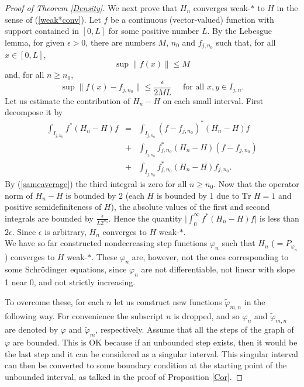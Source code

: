 \documentclass[preprint,12pt]{elsarticle}
\begin{document}
\begin{proof}[Proof of Theorem \ref{Density}]
We next prove that $H_n$  converges weak-$\ast$ to $H$ in the sense of (\ref{weak*conv}). Let $f$ be a continuous (vector-valued) function with support contained in $[0,L]$ for some positive number $L$. By the Lebesgue lemma, for given $\epsilon>0$, there are numbers $M$, $n_0$ and $f_{j,n_0}$ such that, for all $x\in[0,L]$,
\begin{equation*}
  \sup \| f(x) \| \leq M 
\end{equation*}
 and, for all $n\ge n_0$,
\begin{equation*}
  \sup \| f(x)-f_{j,n_0} \| \leq \frac{\epsilon}{2ML} \quad \textrm{ for all } x,y\in I_{j,n}.  
\end{equation*}
Let us estimate the contribution of $H_n-H$  on each small interval. First decompose it by 
\begin{eqnarray*}
\int_{I_{j,n_0}}f^*(H_n-H) f &=& \int_{I_{j,n_0}}(f-f_{j,n_0})^* (H_n-H) f \\
 &+ & \int_{I_{j,n_0}}f_{j,n_0}^* (H_n-H) (f-f_{j,n_0})  \\
 &+&  \int_{I_{j,n_0}}f_{j,n_0}^*(H_n-H) f_{j,n_0}. 
\end{eqnarray*}
By (\ref{sameaverage}) the third integral is zero for all $n\ge n_0$. Now that the operator norm of $H_n-H$ is bounded by 2 (each $H$ is bounded by 1 due to $\textrm{Tr }H=1$ and positive semidefiniteness of $H$), the absolute values of the first and second integrals are bounded by $\frac{\epsilon}{L2^{n_0}}$. Hence  the quantity $\big| \int_0^\infty f^*(H_n-H)f \big|$ is less than $2\epsilon$. Since $\epsilon$ is arbitrary, $H_n$ converges to $H$ weak-$\ast$.\\

We have so far constructed nondecreasing step functions $\varphi_n$ such that $H_n$ ($=P_{\varphi_n}$)  converges to $H$ weak-$*$. These $\varphi_n$ are, however, not the ones corresponding to some Schr\"odinger equations, since $\varphi_n$ are not differentiable, not linear with slope 1 near $0$, and not strictly increasing. 

To overcome these, for each $n$ let us construct new functions $\tilde{\varphi}_{m,n}$ in the following way. For convenience the subscript $n$ is dropped, and so $\varphi_n$ and $\tilde{\varphi}_{m,n}$ are denoted by $\varphi$ and $\tilde{\varphi}_m$, respectively. Assume that all the steps of the graph of $\varphi$ are bounded. This is OK because if an unbounded step exists, then it would be the last step and it can be considered as a singular interval. This singular interval can then be converted to some boundary condition at the starting point of the unbounded interval, as talked in the proof of Proposition \ref{Cor}. 


\end{proof}
\end{document}
